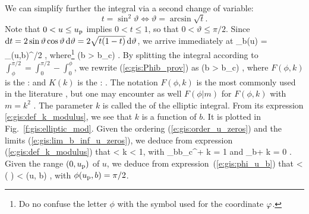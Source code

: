 We can simplify further the integral via a second change of variable:
\[
    t = \sin^2 \vartheta \iff \vartheta = \arcsin\sqrt{t} .
\]
Note that $0<u\leq u_{\rm p}$ implies $0 < t \leq 1$, so that $0<\vartheta\leq \pi/2$.
Since $\mathrm{d} t = 2\sin\vartheta\cos\vartheta \, \mathrm{d}\vartheta = 2\sqrt{t(1-t)}\, \mathrm{d}\vartheta$,
we arrive immediately at
\be \label{e:gis:Phib_prov}
    \Phi_b(u) =   \int_{\phi(u,b)}^{\pi/2}
      ,
\ee
where\footnote{Do no confuse the letter $\phi$ with the symbol used
for the coordinate $\varphi$.}
\be \label{e:gis:phi_u_b}
     \qquad (b > b_{\rm c}) .
\ee
By splitting the integral according to $\int_\phi^{\pi/2} = \int_0^{\pi/2} - \int_0^\phi$,
we rewrite (\ref{e:gis:Phib_prov}) as
\be \label{e:gis:Phib_elliptic_int}
     \qquad (b > b_{\rm c}) ,
\ee
where $F(\phi, k)$ is the
 \cite{ByrdF71,GradsRGTJ115,AbramS72}:
\be \label{e:gis:def_incompl_elliptic_int}
\ee
and $K(k)$ is the :
\be \label{e:gis:def_K_complete}
    .
\ee
The notation $F(\phi, k)$ is the most commonly used
in the literature \cite{ByrdF71,GradsRGTJ115}, but one may encounter as well
$F(\phi|m)$ for $F(\phi, k)$ with $m=k^2$ \cite{AbramS72}.
The parameter $k$ is called the  of
the elliptic integral. From its expression \eqref{e:gis:def_k_modulus}, we
see that $k$ is a function of $b$. It is plotted in Fig.~\ref{f:gis:elliptic_mod}.
Given the ordering (\ref{e:gis:order_u_zeros}) and the limits (\ref{e:gis:lim_b_inf_u_zeros}),
we deduce from expression (\ref{e:gis:def_k_modulus}) that
 < k < 1,
\ee
with
\be
    \lim_{b\to b_{\rm c}^+} k = 1 \qquad\mbox{and}\qquad
    \lim_{b\to +\infty} k = 0 .
\ee
Given the range $(0, u_{\rm p})$ of $u$, we deduce from expression~(\ref{e:gis:phi_u_b})
that
 <  \arcsin\left(  \right)
     < \phi(u, b) \leq {} ,
\ee
with $\phi(u_{\rm p}, b) = \pi/2$.

